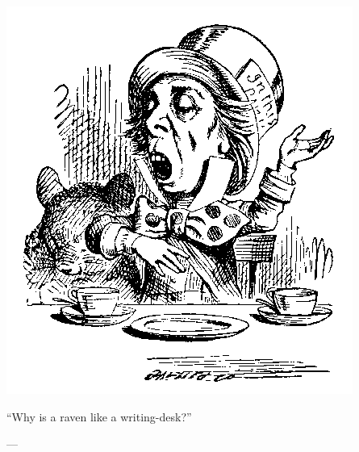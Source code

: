 \cleartoevenpage[\thispagestyle{empty}]

\thispagestyle{empty}

\vspace*{\fill}

\begin{center}
  \includegraphics[scale=0.8]{hatter}
\end{center}

\epigraph{
  ``Why is a raven like a writing-desk?''
}{---\textcite[79]{carroll-2004}}

\vspace*{\fill}

